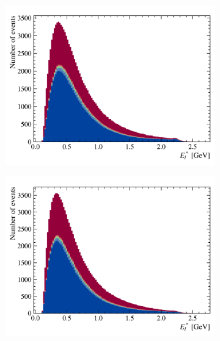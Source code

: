 \begin{figure}[!htb]
\begin{subfigure}[b]{0.32\textwidth}
        \includegraphics[width=\textwidth]{figs-fit-fit-templates/data-driven-plots/misid/D0_el.pdf}
    \end{subfigure}
    \hfill
    \begin{subfigure}[b]{0.32\textwidth}
        \centering
        \includegraphics[width=\textwidth]{figs-fit-fit-templates/data-driven-plots/misid/D0_el_smr.pdf}
    \end{subfigure}
    \hfill
    \begin{subfigure}[b]{0.32\textwidth}
        \centering

\end{subfigure}
\end{figure}
